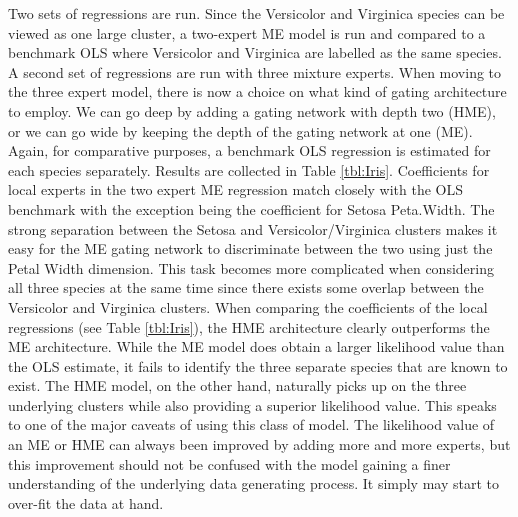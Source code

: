 \documentclass[12pt]{article}
\theoremstyle{definition}
\begin{document}
Two sets of regressions are run. Since the Versicolor and Virginica species can be viewed as one large cluster, a two-expert ME model is run and compared to a benchmark OLS where Versicolor and Virginica are labelled as the same species. A second set of regressions are run with three mixture experts. When moving to the three expert model, there is now a choice on what kind of gating architecture to employ. We can go deep by adding a gating network with depth two (HME), or we can go wide by keeping the depth of the gating network at one (ME). Again, for comparative purposes, a benchmark OLS regression is estimated for each species separately. Results are collected in Table \ref{tbl:Iris}. Coefficients for local experts in the two expert ME regression match closely with the OLS benchmark with the exception being the coefficient for Setosa Peta.Width. The strong separation between the Setosa and Versicolor/Virginica clusters makes it easy for the ME gating network to discriminate between the two using just the Petal Width dimension. This task becomes more complicated when considering all three species at the same time since there exists some overlap between the Versicolor and Virginica clusters. When comparing the coefficients of the local regressions (see Table \ref{tbl:Iris}), the HME architecture clearly outperforms the ME architecture. While the ME model does obtain a larger likelihood value than the OLS estimate, it fails to identify the three separate species that are known to exist. The HME model, on the other hand, naturally picks up on the three underlying clusters while also providing a superior likelihood value. This speaks to one of the major caveats of using this class of model. The likelihood value of an ME or HME can always been improved by adding more and more experts, but this improvement should not be confused with the model gaining a finer understanding of the underlying data generating process. It simply may start to over-fit the data at hand.
\end{document}
